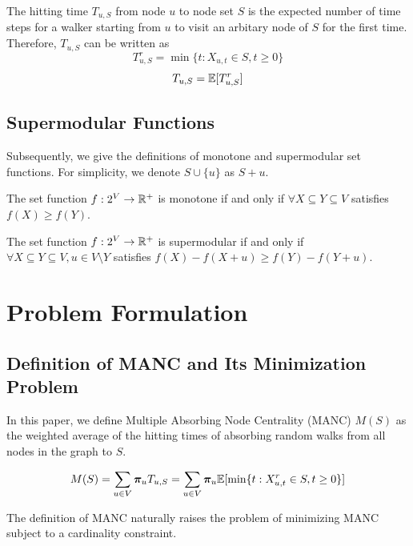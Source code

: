 \documentclass[sigconf]{acmart}
\begin{document}
\begin{definition}
    The hitting time \(T_{u,S}\) from node \(u\) to node set \(S\) is the expected number of time steps for a walker starting from \(u\) to visit an arbitary node of \(S\) for the first time. Therefore, \(T_{u,S}\) can be written as
    \[T_{u,S}^r=\min\{t:X_{u,t}\in S,t\ge0 \}\]
    \[T_{u,S}=\mathbb{E}[T_{u,S}^r]\]
\end{definition}

\subsection{Supermodular Functions}

Subsequently, we give the definitions of monotone and supermodular set functions. For simplicity, we denote \(S\cup\{u\}\) as \(S+u\).

\begin{definition}[Monotonicity]
    The set function \(f:2^{V}\to\mathbb{R}^+\) is monotone if and only if \(\forall X\subseteq Y\subseteq V\) satisfies \(f(X)\ge f(Y)\).
\end{definition}

\begin{definition}[Supermodularity]
    The set function \(f:2^{V}\to\mathbb{R}^+\) is supermodular if and only if \(\forall X\subseteq Y\subseteq V, u\in V\setminus Y\) satisfies \(f(X)-f(X+u)\ge f(Y)-f(Y+u)\).
\end{definition}

\section{Problem Formulation}

\subsection{Definition of MANC and Its Minimization Problem}

In this paper, we define Multiple Absorbing Node Centrality (MANC) \(M(S)\) as the weighted average of the hitting times of absorbing random walks from all nodes in the graph to \(S\).

\begin{definition}[MANC]\label{def:manc}
    \[M(S)=\sum_{u\in V}\boldsymbol{\pi}_u T_{u,S}=\sum_{u\in V}\boldsymbol{\pi}_u \mathbb{E}[\min\{t:X_{u,t}^r\in S,t\ge0\}]\]
\end{definition}

The definition of MANC naturally raises the problem of minimizing MANC subject to a cardinality constraint.
\end{document}
